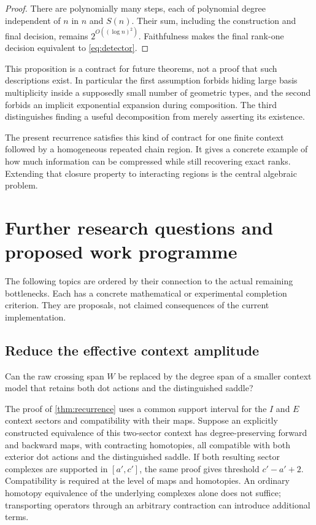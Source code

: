 \begin{proof}
There are polynomially many steps, each of polynomial degree independent
of \(n\) in \(n\) and \(S(n)\). Their sum, including the construction and
final decision, remains \(2^{O((\log n)^2)}\).
Faithfulness makes the final rank-one decision equivalent to
\eqref{eq:detector}.
\end{proof}

This proposition is a contract for future theorems, not a proof that such
descriptions exist. In particular the first assumption forbids hiding
large basis multiplicity inside a supposedly small number of geometric
types, and the second forbids an implicit exponential expansion during
composition. The third distinguishes finding a useful decomposition
from merely asserting its existence.

The present recurrence satisfies this kind of contract for one finite
context followed by a homogeneous repeated chain region. It gives a
concrete example of how much information can be compressed while still
recovering exact ranks. Extending that closure property to interacting
regions is the central algebraic problem.

\section{Further research questions and proposed work programme}
\label{sec:research}

The following topics are ordered by their connection to the actual
remaining bottlenecks. Each has a concrete mathematical or experimental
completion criterion. They are proposals, not claimed consequences of
the current implementation.

\subsection{Reduce the effective context amplitude}

\begin{question}\label{q:amplitude}
Can the raw crossing span \(W\) be replaced by the degree span of a
smaller context model that retains both dot actions and the distinguished
saddle?
\end{question}

The proof of \cref{thm:recurrence} uses a common support interval for the
\(I\) and \(E\) context sectors and compatibility with their maps.
Suppose an explicitly constructed equivalence of this two-sector
context has degree-preserving forward and backward maps, with contracting
homotopies, all compatible with both exterior dot actions and the
distinguished saddle. If both resulting sector complexes are supported
in \([a',c']\), the same proof gives threshold \(c'-a'+2\).
Compatibility is required at the level of maps and homotopies.
An ordinary homotopy equivalence of the underlying complexes alone
does not suffice; transporting operators through an arbitrary
contraction can introduce additional terms.

